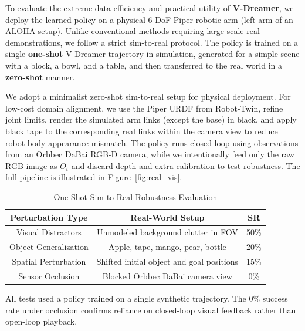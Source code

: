 To evaluate the extreme data efficiency and practical utility of \textbf{V-Dreamer}, we deploy the learned policy on a physical 6-DoF Piper robotic arm (left arm of an ALOHA setup). Unlike conventional methods requiring large-scale real demonstrations, we follow a strict sim-to-real protocol. The policy is trained on a single \textbf{one-shot} V-Dreamer trajectory in simulation, generated for a simple scene with a block, a bowl, and a table, and then transferred to the real world in a \textbf{zero-shot} manner.


We adopt a minimalist zero-shot sim-to-real setup for physical deployment. For low-cost domain alignment, we use the Piper URDF from Robot-Twin, refine joint limits, render the simulated arm links (except the base) in black, and apply black tape to the corresponding real links within the camera view to reduce robot-body appearance mismatch. The policy runs closed-loop using observations from an Orbbec DaBai RGB-D camera, while we intentionally feed only the raw RGB image as $O_t$ and discard depth and extra calibration to test robustness. The full pipeline is illustrated in Figure~\ref{fig:real_vis}. 

\begin{table}[htbp]
\begin{threeparttable}
\centering
\caption{One-Shot Sim-to-Real Robustness Evaluation}
\label{tab:real_world_robustness}
\begin{tabular}{@{}ccc@{}}
\toprule
\centering
\textbf{Perturbation Type} & \textbf{Real-World Setup} & \textbf{SR} \\ \midrule
Visual Distractors & Unmodeled background clutter in FOV & 50\% \\
Object Generalization & Apple, tape, mango, pear, bottle & 20\% \\
Spatial Perturbation & Shifted initial object and goal positions & 15\% \\
Sensor Occlusion & Blocked Orbbec DaBai camera view & 0\% \\ \bottomrule
\end{tabular}

\begin{tablenotes}
\item All tests used a policy trained on a single synthetic trajectory. The 0\% success rate under occlusion confirms reliance on closed-loop visual feedback rather than open-loop playback.
\end{tablenotes}

\end{threeparttable}
    \vspace{-1em}
\end{table}

